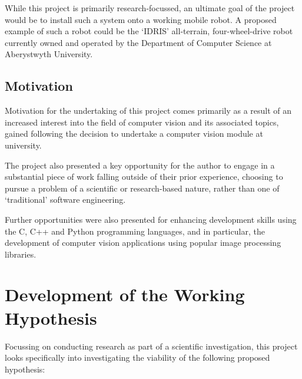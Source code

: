 
While this project is primarily research-focussed, an ultimate goal of the project would be to install such a system onto a working mobile robot. A proposed example of such a robot could be the `IDRIS' all-terrain, four-wheel-drive robot currently owned and operated by the Department of Computer Science at Aberystwyth University.


\subsection{Motivation}

Motivation for the undertaking of this project comes primarily as a result of an increased interest into the field of computer vision and its associated topics, gained following the decision to undertake a computer vision module at university.

The project also presented a key opportunity for the author to engage in a substantial piece of work falling outside of their prior experience, choosing to pursue a problem of a scientific or research-based nature, rather than one of `traditional' software engineering. 

Further opportunities were also presented for enhancing development skills using the C, C++ and Python programming languages, and in particular, the development of computer vision applications using popular image processing libraries.


\section{Development of the Working Hypothesis} 

Focussing on conducting research as part of a scientific investigation, this project looks specifically into investigating the viability of the following proposed hypothesis: 

